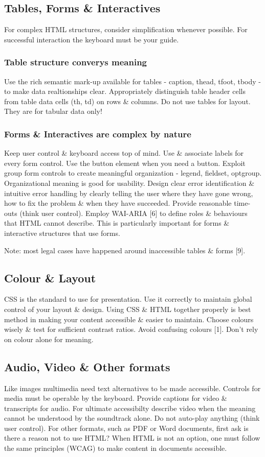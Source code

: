 \documentclass{acm_proc_article-sp}
\begin{document}
\subsection{Tables, Forms \& Interactives}
For complex HTML structures, consider simplification whenever possible. For successful interaction the keyboard must be your guide.
\subsubsection{Table structure converys meaning}
Use the rich semantic mark-up available for tables - caption, thead, tfoot, tbody - to make data realtionships clear. Appropriately distinguish table header cells from table data cells (th, td) on rows \& columns. Do not use tables for layout. They are for tabular data only!
\subsubsection{Forms \& Interactives are complex by nature}
Keep user control \& keyboard access top of mind. Use \& associate labels for every form control. Use the button element when you need a button. Exploit group form controls to create meaningful organization - legend, fieldset, optgroup. Organizational meaning is good for usability. Design clear error identification \& intuitive error handling by clearly telling the user where they have gone wrong, how to fix the problem \& when they have succeeded. Provide reasonable time-outs (think user control). Employ WAI-ARIA [6] to define roles \& behaviours that HTML cannot describe. This is particularly important for forms \& interactive structures that use forms.

Note: most legal cases have happened around inaccessible tables \& forms [9].

\subsection{Colour \& Layout}
CSS is the standard to use for presentation. Use it correctly to maintain global control of your layout \& design. Using CSS \& HTML together properly is best method in making your content accessible \& easier to maintain. Choose colours wisely \& test for sufficient contrast ratios. Avoid confusing colours [1]. Don't rely on colour alone for meaning.

\subsection{Audio, Video \& Other formats}
Like images multimedia need text alternatives to be made accessible. Controls for media must be operable by the keyboard. Provide captions for video \& transcripts for audio. For ultimate accessibilty describe video when the meaning cannot be understood by the soundtrack alone. Do not auto-play anything (think user control). For other formats, such as PDF or Word documents, first ask is there a reason not to use HTML? When HTML is not an option, one must follow the same principles (WCAG) to make content in documents accessible.
\end{document}
